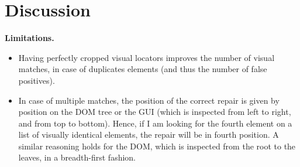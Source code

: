 \section{Discussion}\label{sec:discussion}

\textbf{Limitations.} 

\begin{itemize}
\item Having perfectly cropped visual locators improves the number of visual matches, in case of duplicates elements (and thus the number of false positives).
\item In case of multiple matches, the position of the correct repair is given by position on the DOM tree or the GUI (which is inspected from left to right, and from top to bottom). Hence, if I am looking for the fourth element on a list of visually identical elements, the repair will be in fourth position. A similar reasoning holds for the DOM, which is inspected from the root to the leaves, in a breadth-first fashion.
\end{itemize}

